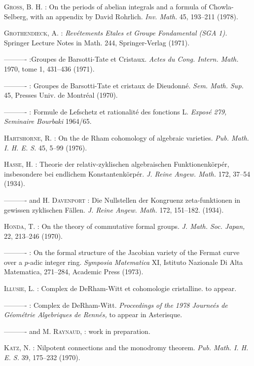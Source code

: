 \begin{thebibliography}{99}
 \textsc{Gross,} B. H. : On the periods of abelian integrals and a formula of Chowla-Selberg, with an appendix by David Rohrlich. {\em Inv. Math.} 45, 193--211 (1978).

 \textsc{Grothendieck,} A. : {\em Rev\'etements Etales et Groupe Fondamental (SGA 1).} Springer Lecture Notes in Math. 244, Springer-Verlag (1971).

 ---------- :\pageoriginale Groupes de Barsotti-Tate et Cristaux. {\em Actes du Cong. Intern. Math.} 1970, tome 1, 431--436 (1971).

 ---------- : Groupes de Barsotti-Tate et cristaux de Dieudonn\'e. {\em Sem. Math. Sup.} 45, Presses Univ. de Montr\'eal (1970).

 ---------- : Formule de Lefschetz et rationalit\'e des fonctions L. {\em Expos\'e 279, Seminaire Bourbaki} 1964/65.

 \textsc{Hartshorne,} R. : On the de Rham cohomology of algebraic varieties. {\em Pub. Math. I. H. E. S.} 45, 5--99 (1976).

 \textsc{Hasse,} H. : Theorie der relativ-zyklischen algebraischen Funktionenk\"orp\'er, insbesondere bei endlichem Konstantenk\"orp\'er. {\em J. Reine Angew. Math.} 172, 37--54 (1934).

 ---------- and H. \textsc{Davenport} : Die Nullstellen der Kongruenz zeta-funktionen in gewissen zyklischen F\"allen. {\em J. Reine Angew. Math.} 172, 151--182. (1934).

 \textsc{Honda}, T. : On the theory of commutative formal groups. {\em J. Math. Soc. Japan,} 22, 213--246 (1970).

 ---------- : On the formal structure of the Jacobian variety of the Fermat curve over a $p$-adic integer ring. {\em Symposia Matematica} XI, Istituto Nazionale Di Alta Matematica, 271--284, Academic Press (1973).

 \textsc{Illusie,} L. : Complex de DeRham-Witt et cohomologie cristalline. to appear.

 ---------- : Complex de DeRham-Witt. {\em Proceedings of the 1978 Journe\'es de G\'eom\'etrie Algebriques de Renn\'es,} to appear in Asterisque.

 ---------- and M. \textsc{Raynaud,} : work in preparation.

 \textsc{Katz,} N. : Nilpotent connections and the monodromy theorem. {\em Pub. Math. I. H. E. S.} 39, 175--232 (1970).


\end{thebibliography}
